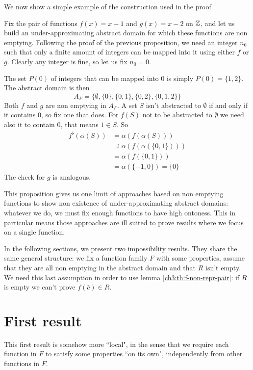 We now show a simple example of the construction used in the proof
\begin{example}
	Fix the pair of functions $f(x) = x - 1$ and $g(x) = x - 2$ on $\mathbb{Z}$, and let us build an under-approximating abstract domain for which these functions are non emptying. Following the proof of the previous proposition, we need an integer $n_0$ such that only a finite amount of integers can be mapped into it using either $f$ or $g$. Clearly any integer is fine, so let us fix $n_0 = 0$.

	The set $P(0)$ of integers that can be mapped into $0$ is simply $P(0) = \{ 1, 2 \}$. The abstract domain is then
	\[
	A_F = \{ \emptyset, \{ 0 \}, \{ 0, 1 \}, \{ 0, 2 \}, \{ 0, 1, 2 \} \}
	\]
	Both $f$ and $g$ are non emptying in $A_F$. A set $S$ isn't abstracted to $\emptyset$ if and only if it contains $0$, so fix one that does.
	For $f(S)$ not to be abstracted to $\emptyset$ we need also it to contain $0$, that means $1 \in S$. So
	\begin{align*}
		f^{\flat}(\alpha(S)) &= \alpha(f(\alpha(S))) \\
		&\supseteq \alpha(f(\alpha(\{ 0, 1 \}))) \\
		&= \alpha(f(\{ 0, 1 \})) \\
		&= \alpha(\{ -1, 0 \}) = \{ 0 \}
	\end{align*}
	The check for $g$ is analogous.
\end{example}

This proposition gives us one limit of approaches based on non emptying functions to show non existence of under-approximating abstract domains: whatever we do, we must fix enough functions to have high ontoness. This in particular means those approaches are ill suited to prove results where we focus on a single function.

In the following sections, we present two impossibility results. They share the same general structure: we fix a function family $F$ with some properties, assume that they are all non emptying in the abstract domain and that $R$ isn't empty. We need this last assumption in order to use lemma \ref{ch3:th:f-non-repr-pair}: if $R$ is empty we can't prove $f(\bar{c}) \in R$.

\section{First result}
This first result is somehow more ``local", in the sense that we require each function in $F$ to satisfy some properties ``on its own", independently from other functions in $F$.

